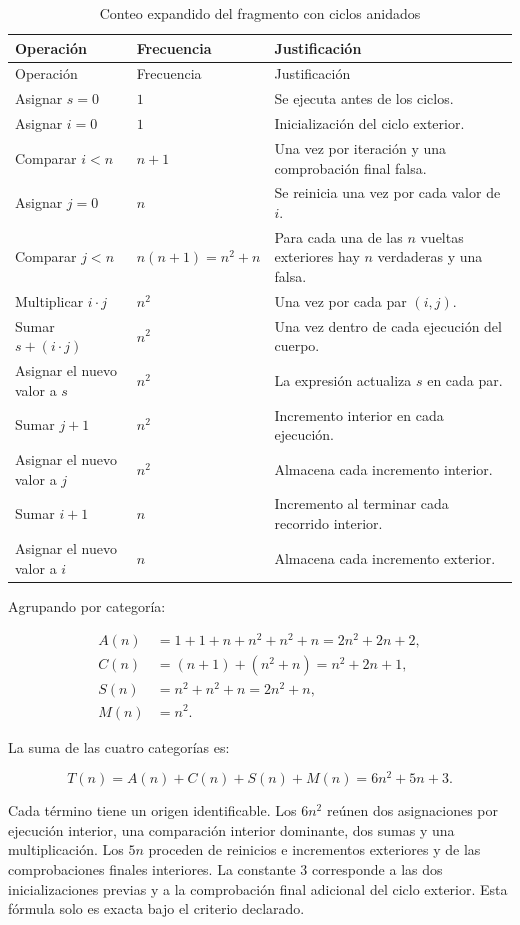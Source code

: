 \documentclass[12pt,letterpaper]{article}
\begin{document}
\begin{longtable}{p{5.7cm}p{3cm}p{5cm}}
\caption{Conteo expandido del fragmento con ciclos anidados}\\
\toprule
Operación & Frecuencia & Justificación\\
\midrule
\endfirsthead
\toprule
Operación & Frecuencia & Justificación\\
\midrule
\endhead
Asignar $s=0$ & $1$ & Se ejecuta antes de los ciclos.\\
Asignar $i=0$ & $1$ & Inicialización del ciclo exterior.\\
Comparar $i<n$ & $n+1$ & Una vez por iteración y una comprobación final falsa.\\
Asignar $j=0$ & $n$ & Se reinicia una vez por cada valor de $i$.\\
Comparar $j<n$ & $n(n+1)=n^2+n$ & Para cada una de las $n$ vueltas exteriores hay $n$ verdaderas y una falsa.\\
Multiplicar $i\cdot j$ & $n^2$ & Una vez por cada par $(i,j)$.\\
Sumar $s+(i\cdot j)$ & $n^2$ & Una vez dentro de cada ejecución del cuerpo.\\
Asignar el nuevo valor a $s$ & $n^2$ & La expresión actualiza $s$ en cada par.\\
Sumar $j+1$ & $n^2$ & Incremento interior en cada ejecución.\\
Asignar el nuevo valor a $j$ & $n^2$ & Almacena cada incremento interior.\\
Sumar $i+1$ & $n$ & Incremento al terminar cada recorrido interior.\\
Asignar el nuevo valor a $i$ & $n$ & Almacena cada incremento exterior.\\
\bottomrule
\end{longtable}

Agrupando por categoría:

\begin{align*}
A(n)&=1+1+n+n^2+n^2+n=2n^2+2n+2,\\
C(n)&=(n+1)+(n^2+n)=n^2+2n+1,\\
S(n)&=n^2+n^2+n=2n^2+n,\\
M(n)&=n^2.
\end{align*}

La suma de las cuatro categorías es:

\[
T(n)=A(n)+C(n)+S(n)+M(n)=6n^2+5n+3.
\]

Cada término tiene un origen identificable. Los $6n^2$ reúnen dos asignaciones por ejecución interior, una comparación interior dominante, dos sumas y una multiplicación. Los $5n$ proceden de reinicios e incrementos exteriores y de las comprobaciones finales interiores. La constante $3$ corresponde a las dos inicializaciones previas y a la comprobación final adicional del ciclo exterior. Esta fórmula solo es exacta bajo el criterio declarado.
\end{document}
